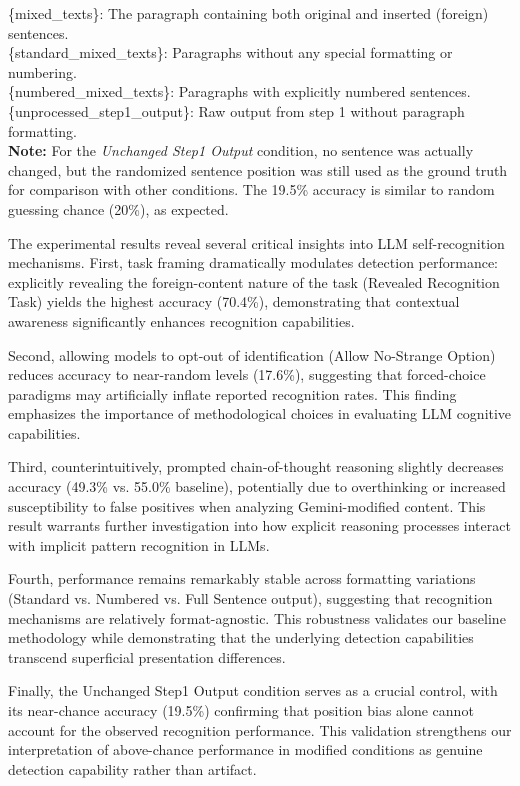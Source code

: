 \documentclass{article}
\begin{document}
\begin{table}[ht]
\begin{flushleft}
{\{mixed\_texts\}: The paragraph containing both original and inserted (foreign) sentences. \\
\{standard\_mixed\_texts\}: Paragraphs without any special formatting or numbering. \\
\{numbered\_mixed\_texts\}: Paragraphs with explicitly numbered sentences. \\
\{unprocessed\_step1\_output\}: Raw output from step 1 without paragraph formatting. \\
\textbf{Note:} For the {\it Unchanged Step1 Output} condition, no sentence was actually changed, but the randomized sentence position was still used as the ground truth for comparison with other conditions. The 19.5\% accuracy is similar to random guessing chance (20\%), as expected.
}
\end{flushleft}
\end{table}

The experimental results reveal several critical insights into LLM self-recognition mechanisms. First, task framing dramatically modulates detection performance: explicitly revealing the foreign-content nature of the task (Revealed Recognition Task) yields the highest accuracy (70.4\%), demonstrating that contextual awareness significantly enhances recognition capabilities.

Second, allowing models to opt-out of identification (Allow No-Strange Option) reduces accuracy to near-random levels (17.6\%), suggesting that forced-choice paradigms may artificially inflate reported recognition rates. This finding emphasizes the importance of methodological choices in evaluating LLM cognitive capabilities.

Third, counterintuitively, prompted chain-of-thought reasoning slightly decreases accuracy (49.3\% vs. 55.0\% baseline), potentially due to overthinking or increased susceptibility to false positives when analyzing Gemini-modified content. This result warrants further investigation into how explicit reasoning processes interact with implicit pattern recognition in LLMs.

Fourth, performance remains remarkably stable across formatting variations (Standard vs. Numbered vs. Full Sentence output), suggesting that recognition mechanisms are relatively format-agnostic. This robustness validates our baseline methodology while demonstrating that the underlying detection capabilities transcend superficial presentation differences.

Finally, the Unchanged Step1 Output condition serves as a crucial control, with its near-chance accuracy (19.5\%) confirming that position bias alone cannot account for the observed recognition performance. This validation strengthens our interpretation of above-chance performance in modified conditions as genuine detection capability rather than artifact.
\end{document}
